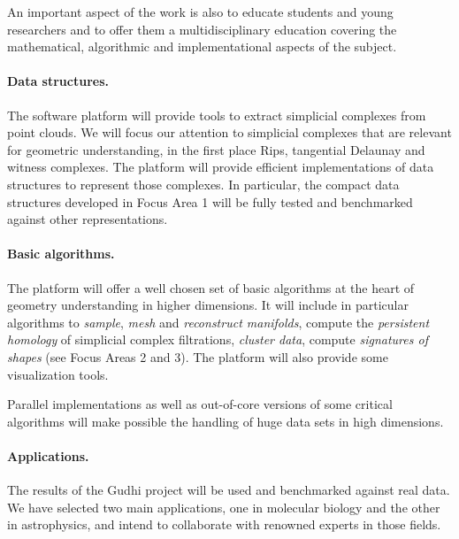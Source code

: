 An important aspect of the work is also to educate students and young
researchers and to offer them a multidisciplinary education covering
the mathematical, algorithmic and implementational aspects of the subject.


\paragraph{Data structures.}
The software platform will provide tools to extract simplicial
complexes from point clouds. We will focus our attention to simplicial
complexes that are relevant for geometric understanding, in the first
place Rips,
tangential Delaunay and witness complexes.  The platform will provide
efficient implementations of data structures to represent those
complexes. In particular, the compact data structures developed in
Focus Area 1 will be fully tested and benchmarked against other
representations.

\paragraph{Basic algorithms.}
The platform will offer a well chosen set of basic algorithms at the
heart of geometry understanding in higher dimensions. It will include
in particular algorithms to {\em sample}, {\em mesh} and {\em
reconstruct manifolds}, compute the {\em persistent homology} of
simplicial complex filtrations, {\em cluster data}, compute {\em
signatures of shapes} (see Focus Areas 2 and 3). The platform will
also provide some visualization tools.


Parallel implementations as well as out-of-core versions of some
critical algorithms %
will make possible the handling of huge data sets in high dimensions.

\paragraph{Applications.}
The results of the Gudhi project will be used and benchmarked against
real data. We have selected two main applications, one in molecular
biology and the other in astrophysics, and intend to
collaborate with renowned experts in those fields. 


